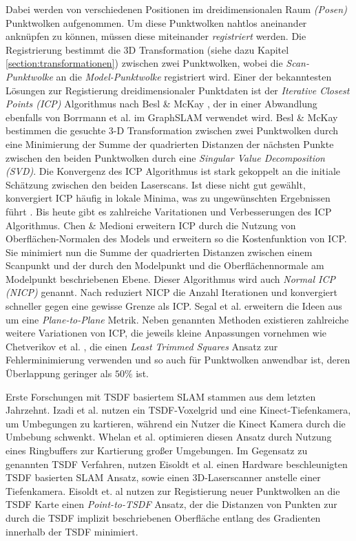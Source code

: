 Dabei werden von verschiedenen Positionen im dreidimensionalen Raum \emph{(Posen)} Punktwolken aufgenommen. Um diese Punktwolken nahtlos aneinander anknüpfen zu können, müssen diese miteinander \emph{registriert} werden. Die Registrierung bestimmt die 3D Transformation (siehe dazu Kapitel \ref{section:transformationen}) zwischen zwei Punktwolken, wobei die \emph{Scan-Punktwolke} an die \emph{Model-Punktwolke} registriert wird.
Einer der bekanntesten Lösungen zur Registierung dreidimensionaler Punktdaten ist der \emph{Iterative Closest Points (ICP)} Algorithmus nach Besl \& McKay \cite{besl1992method}, der in einer Abwandlung ebenfalls von Borrmann et al. im GraphSLAM \cite{borrmann2008globally} verwendet wird.
Besl \& McKay \cite{besl1992method} bestimmen die gesuchte 3-D Transformation zwischen zwei Punktwolken durch eine Minimierung der Summe der quadrierten Distanzen der nächsten Punkte zwischen den beiden Punktwolken durch eine \emph{Singular Value Decomposition (SVD)}.
Die Konvergenz des ICP Algorithmus ist stark gekoppelt an die initiale Schätzung zwischen den beiden Laserscans. Ist diese nicht gut gewählt, konvergiert ICP häufig in lokale Minima, was zu ungewünschten Ergebnissen führt \cite{he2017iterative}. 
Bis heute gibt es zahlreiche Varitationen und Verbesserungen des ICP Algorithmus.
Chen \& Medioni \cite{chen1992object} erweitern ICP durch die Nutzung von Oberflächen-Normalen des Models und erweitern so die Kostenfunktion von ICP. Sie minimiert nun die Summe der quadrierten Distanzen zwischen einem Scanpunkt und der durch den Modelpunkt und die Oberflächennormale am Modelpunkt beschriebenen Ebene. Dieser Algorithmus wird auch \emph{Normal ICP (NICP)} genannt. 
Nach \cite{he2017iterative} reduziert NICP die Anzahl Iterationen und konvergiert schneller  gegen eine gewisse Grenze als ICP.
Segal et al. \cite{segal2009generalized} erweitern die Ideen aus \cite{chen1992object} um eine \emph{Plane-to-Plane} Metrik.
Neben genannten Methoden existieren zahlreiche weitere Variationen von ICP, die jeweils kleine Anpassungen vornehmen wie Chetverikov et al. \cite{chetverikov2005robust}, die einen \emph{Least Trimmed Squares} Ansatz zur Fehlerminimierung verwenden und so auch für Punktwolken anwendbar ist, deren Überlappung geringer als $50\%$ ist.

Erste Forschungen mit TSDF basiertem SLAM stammen aus dem letzten Jahrzehnt.
Izadi et al. \cite{izadi2011kinectfusion} nutzen ein TSDF-Voxelgrid und eine Kinect-Tiefenkamera, um Umbegungen zu kartieren, während ein Nutzer die Kinect Kamera durch die Umbebung schwenkt.
Whelan et al. \cite{whelan2012kintinuous} optimieren diesen Ansatz durch Nutzung eines Ringbuffers zur Kartierung großer Umgebungen.
Im Gegensatz zu genannten TSDF Verfahren, nutzen Eisoldt et al. \cite{HATSDF} einen Hardware beschleunigten TSDF basierten SLAM Ansatz, sowie einen 3D-Laserscanner anstelle einer Tiefenkamera. Eisoldt et. al \cite{HATSDF} nutzen zur Registierung neuer Punktwolken an die TSDF Karte einen \emph{Point-to-TSDF} Ansatz, der die Distanzen von Punkten zur durch die TSDF implizit beschriebenen Oberfläche entlang des Gradienten innerhalb der TSDF minimiert.


